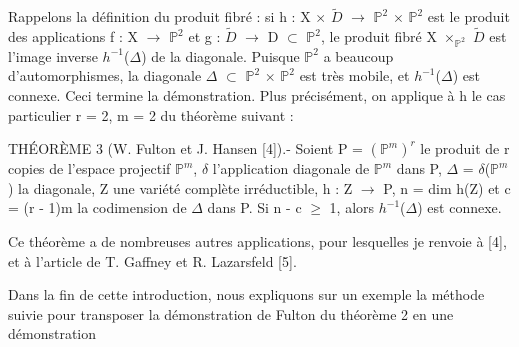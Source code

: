 \documentclass[10pt,a4paper]{article}
\begin{document}
\begin{adjustbox}{max totalsize={\textwidth}{0.945\textheight},center}
\begin{minipage}{\textwidth}
\noindent Rappelons la définition du produit fibré : si h : X \ensuremath{×} \ensuremath{\widetilde{D}} \ensuremath{→} \ensuremath{ℙ^2} \ensuremath{×} \ensuremath{ℙ^2} est le produit des applications f : X \ensuremath{→} \ensuremath{ℙ^2} et g : \ensuremath{\widetilde{D}} \ensuremath{→} D \ensuremath{⊂} \ensuremath{ℙ^2}, le produit fibré X \ensuremath{×_{ℙ^2}} \ensuremath{\widetilde{D}} est l'image inverse \ensuremath{h^{-1}}(\ensuremath{Δ}) de la diagonale. Puisque \ensuremath{ℙ^2} a beaucoup d'automorphismes, la diagonale \ensuremath{Δ} \ensuremath{⊂} \ensuremath{ℙ^2} \ensuremath{×} \ensuremath{ℙ^2} est très mobile, et \ensuremath{h^{-1}}(\ensuremath{Δ}) est connexe. Ceci termine la démonstration. Plus précisément, on applique à h le cas particulier r = 2, m = 2 du théorème suivant :\par\smallskip
\noindent THÉORÈME 3 (W. Fulton et J. Hansen [4]).- Soient P = \ensuremath{(ℙ^m)^r} le produit de r copies de l'espace projectif \ensuremath{ℙ^m}, \ensuremath{δ} l'application diagonale de \ensuremath{ℙ^m} dans P, \ensuremath{Δ} = \ensuremath{δ}(\ensuremath{ℙ^m}) la diagonale, Z une variété complète irréductible, h : Z \ensuremath{→} P, n = dim h(Z) et c = (r - 1)m la codimension de \ensuremath{Δ} dans P. Si n - c \ensuremath{≥} 1, alors \ensuremath{h^{-1}}(\ensuremath{Δ}) est connexe.\par\smallskip
\noindent Ce théorème a de nombreuses autres applications, pour lesquelles je renvoie à [4], et à l'article de T. Gaffney et R. Lazarsfeld [5].\par\smallskip
\noindent Dans la fin de cette introduction, nous expliquons sur un exemple la méthode suivie pour transposer la démonstration de Fulton du théorème 2 en une démonstration\par\smallskip
\end{minipage}
\end{adjustbox}
\newpage
\end{document}
